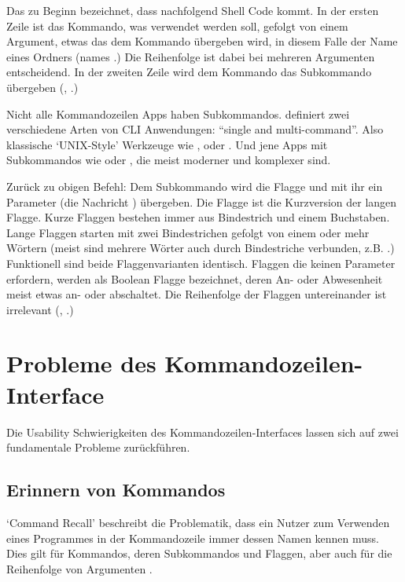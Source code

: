\documentclass[oneside,bibliography=totocnumbered,BCOR=5mm]{scrbook}
\begin{document}
Das \codeinline{\$} zu Beginn bezeichnet, dass nachfolgend Shell Code kommt. In
der ersten Zeile ist  das Kommando, was verwendet werden soll,
gefolgt von einem Argument, etwas das dem Kommando übergeben wird, in diesem
Falle der Name eines Ordners (names .) Die Reihenfolge
ist dabei bei mehreren Argumenten entscheidend. In der zweiten Zeile wird
dem  Kommando das Subkommando  übergeben
(\textcite{nagarajan2018}, \textcite{clig}.)

Nicht alle Kommandozeilen Apps haben Subkommandos. \textcite{12factor} definiert
zwei verschiedene Arten von CLI Anwendungen: ``single and multi-command''. Also
klassische `UNIX-Style' Werkzeuge wie ,  oder
. Und jene Apps mit Subkommandos wie  oder
, die meist moderner und komplexer sind.

Zurück zu obigen  Befehl: Dem  Subkommando
wird die  Flagge und mit ihr ein Parameter (die Nachricht
) übergeben. Die  Flagge ist die
Kurzversion der langen  Flagge. Kurze Flaggen bestehen
immer aus Bindestrich und einem Buchstaben. Lange Flaggen starten mit zwei
Bindestrichen gefolgt von einem oder mehr Wörtern (meist sind mehrere Wörter
auch durch Bindestriche verbunden, z.B. .)
Funktionell sind beide Flaggenvarianten identisch. Flaggen die keinen Parameter
erfordern, werden als Boolean Flagge bezeichnet, deren An- oder Abwesenheit
meist etwas an- oder abschaltet. Die Reihenfolge der Flaggen untereinander ist
irrelevant (\textcite{nagarajan2018}, \textcite{clig}.)

\chapter{Probleme des Kommandozeilen-Interface}
\label{sec:cli-problems}

Die Usability Schwierigkeiten des Kommandozeilen-Interfaces lassen sich auf zwei
fundamentale Probleme zurückführen.

\section{Erinnern von Kommandos}

`Command Recall' beschreibt die Problematik, dass ein Nutzer zum Verwenden eines
Programmes in der Kommandozeile immer dessen Namen kennen muss. Dies gilt für
Kommandos, deren Subkommandos und Flaggen, aber auch für die Reihenfolge von
Argumenten \parencite{Raskin_2008}.
\end{document}
